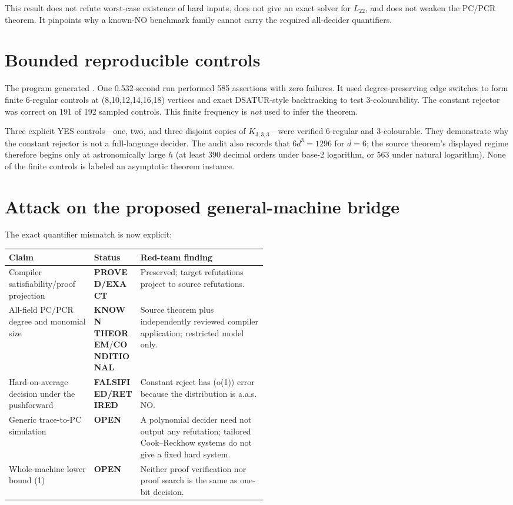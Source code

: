 \documentclass[11pt]{article}
\newcommand{\EXACT}{\textbf{PROVED/EXACT}}
\newcommand{\KNOWN}{\textbf{KNOWN THEOREM}}
\newcommand{\COND}{\textbf{CONDITIONAL}}
\newcommand{\OPEN}{\textbf{OPEN}}
\newcommand{\RET}{\textbf{FALSIFIED/RETIRED}}
\newcommand{\Ltwo}{L_{22}}
\begin{document}
This result does not refute worst-case existence of hard inputs, does not give
an exact solver for \(\Ltwo\), and does not weaken the PC/PCR theorem.  It
pinpoints why a known-NO benchmark family cannot carry the required
all-decider quantifiers.

\section{Bounded reproducible controls}
The program
 generated
.
One 0.532-second run performed 585 assertions with zero failures.  It used
degree-preserving edge switches to form finite 6-regular controls at
(8,10,12,14,16,18) vertices and exact DSATUR-style backtracking to test
3-colourability.  The constant rejector was correct on 191 of 192 sampled
controls.  This finite frequency is \emph{not} used to infer the theorem.

Three explicit YES controls---one, two, and three disjoint copies of
\(K_{3,3,3}\)---were verified 6-regular and 3-colourable.  They demonstrate
why the constant rejector is not a full-language decider.  The audit also
records that \(6d^3=1296\) for \(d=6\); the source theorem's displayed regime
therefore begins only at astronomically large \(h\) (at least 390 decimal
orders under base-2 logarithm, or 563 under natural logarithm).  None of the
finite controls is labeled an asymptotic theorem instance.

\section{Attack on the proposed general-machine bridge}
The exact quantifier mismatch is now explicit:
\begin{center}
\begin{tabularx}{0.98\linewidth}{@{}p{0.33\linewidth}p{0.18\linewidth}X@{}}
\toprule
Claim & Status & Red-team finding\\
\midrule
Compiler satisfiability/proof projection & \EXACT & Preserved; target refutations project to source refutations.\\
All-field PC/PCR degree and monomial size & \KNOWN/\COND & Source theorem plus independently reviewed compiler application; restricted model only.\\
Hard-on-average decision under the pushforward & \RET & Constant reject has (o(1)) error because the distribution is a.a.s. NO.\\
Generic trace-to-PC simulation & \OPEN & A polynomial decider need not output any refutation; tailored Cook--Reckhow systems do not give a fixed hard system.\\
Whole-machine lower bound (1) & \OPEN & Neither proof verification nor proof search is the same as one-bit decision.\\
\bottomrule
\end{tabularx}
\end{center}
\end{document}
